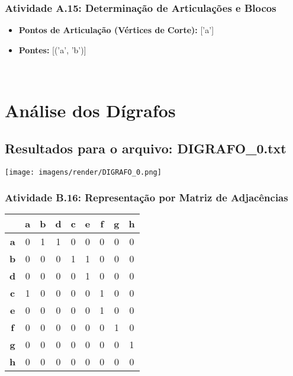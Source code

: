 \documentclass[a4paper,12pt]{article}
\begin{document}
\subsubsection*{Atividade A.15: Determinação de Articulações e Blocos}
\begin{itemize}[nosep, leftmargin=*]
    \item \textbf{Pontos de Articulação (Vértices de Corte):} ['a']
    \item \textbf{Pontes:} [('a', 'b')]
\end{itemize}

\\ 

\section{Análise dos Dígrafos}

\subsection{Resultados para o arquivo: DIGRAFO\_0.txt}

\begin{center}
    \texttt{[image: imagens/render/DIGRAFO\_0.png]}
\end{center}

\subsubsection*{Atividade B.16: Representação por Matriz de Adjacências}
\begin{center}
\scriptsize
\begin{tabular*}{\textwidth}{c|@{\extracolsep{\fill}}cccccccc}
\rowcolor[gray]{0.9}
  & \textbf{a} & \textbf{b} & \textbf{d} & \textbf{c} & \textbf{e} & \textbf{f} & \textbf{g} & \textbf{h} \\
\hline
\textbf{a} & 0 & 1 & 1 & 0 & 0 & 0 & 0 & 0 \\
\textbf{b} & 0 & 0 & 0 & 1 & 1 & 0 & 0 & 0 \\
\textbf{d} & 0 & 0 & 0 & 0 & 1 & 0 & 0 & 0 \\
\textbf{c} & 1 & 0 & 0 & 0 & 0 & 1 & 0 & 0 \\
\textbf{e} & 0 & 0 & 0 & 0 & 0 & 1 & 0 & 0 \\
\textbf{f} & 0 & 0 & 0 & 0 & 0 & 0 & 1 & 0 \\
\textbf{g} & 0 & 0 & 0 & 0 & 0 & 0 & 0 & 1 \\
\textbf{h} & 0 & 0 & 0 & 0 & 0 & 0 & 0 & 0 \\
\end{tabular*}
\end{center}
\end{document}
